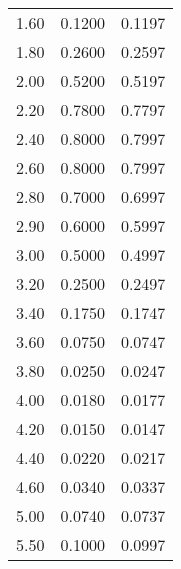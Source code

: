 \begin{tabular}{S[table-format=2.2]S[table-format=1.4]S[table-format=1.4]}
		1.60 & 0.1200 & 0.1197 \\
		1.80 & 0.2600 & 0.2597 \\
		2.00 & 0.5200 & 0.5197 \\
		2.20 & 0.7800 & 0.7797 \\
		2.40 & 0.8000 & 0.7997 \\
		2.60 & 0.8000 & 0.7997 \\
		2.80 & 0.7000 & 0.6997 \\
		2.90 & 0.6000 & 0.5997 \\
		3.00 & 0.5000 & 0.4997 \\
		3.20 & 0.2500 & 0.2497 \\
		3.40 & 0.1750 & 0.1747 \\
		3.60 & 0.0750 & 0.0747 \\
		3.80 & 0.0250 & 0.0247 \\
		4.00 & 0.0180 & 0.0177 \\
		4.20 & 0.0150 & 0.0147 \\
		4.40 & 0.0220 & 0.0217 \\
		4.60 & 0.0340 & 0.0337 \\
		5.00 & 0.0740 & 0.0737 \\
		5.50 & 0.1000 & 0.0997 \\
		\bottomrule
	\end{tabular}
